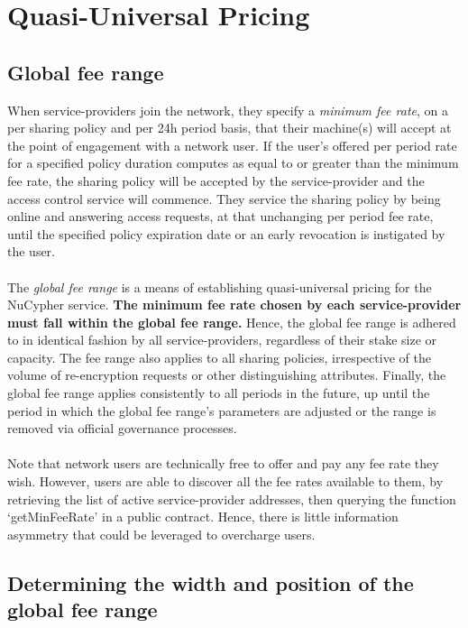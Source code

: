 \documentclass[longbibliography,nofootinbib]{revtex4-1}
\begin{document}
\section{Quasi-Universal Pricing}

\subsection{Global fee range}

When service-providers join the network, they specify a \textit{minimum fee rate}, on a per sharing policy and per 24h period basis, that their machine(s) will accept at the point of engagement with a network user. If the user’s offered per period rate for a specified policy duration computes as equal to or greater than the minimum fee rate, the sharing policy will be accepted by the service-provider and the access control service will commence. They service the sharing policy by being online and answering access requests, at that unchanging per period fee rate, until the specified policy expiration date or an early revocation is instigated by the user.
\\\\
The \textit{global fee range} is a means of establishing quasi-universal pricing for the NuCypher service. \textbf{The minimum fee rate chosen by each service-provider must fall within the global fee range.} Hence, the global fee range is adhered to in identical fashion by all service-providers, regardless of their stake size or capacity. The fee range also applies to all sharing policies, irrespective of the volume of re-encryption requests or other distinguishing attributes. Finally, the global fee range applies consistently to all periods in the future, up until the period in which the global fee range’s parameters are adjusted or the range is removed via official governance processes. 
\\\\
Note that network users are technically free to offer and pay any fee rate they wish. However, users are able to discover all the fee rates available to them, by retrieving the list of active service-provider addresses, then querying the function `getMinFeeRate' in a public contract. Hence, there is little information asymmetry that could be leveraged to overcharge users.  

\subsection{Determining the width and position of the global fee range} \label{width}
\end{document}

